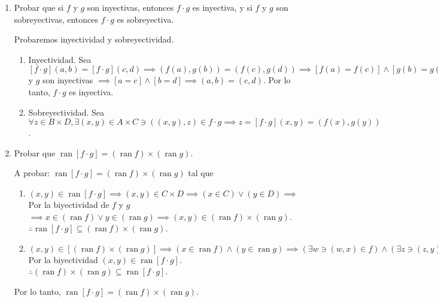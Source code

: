 \begin{problema}[Ejercicio 5]
\begin{enumerate}
\begin{dem}
		\end{dem}
		\item Probar que si $f$ y $g$ son inyectivas, entonces $f \cdot g$ es inyectiva, y si $f$ y $g$ son sobreyectivas, entonces $f \cdot g$ es sobreyectiva. 
		\begin{dem}
			Probaremos inyectividad y sobreyectividad. 
			\begin{enumerate}
				\item Inyectividad. Sea 
					$[f\cdot g](a,b) = [f\cdot g](c,d)\implies(f(a),g(b))=(f(c),g(d))\implies [f(a)=f(c)]\wedge [g(b)=g(d)]\implies f$ y $g$ son inyectivas $\implies[a=c]\wedge [b=d]\implies (a,b)=(c,d)$. Por lo tanto, $f\cdot g$ es inyectiva.   
				\item Sobreyectividad. Sea $\forall z\in B\times D, \exists(x,y)\in A\times C\ni ((x,y),z)\in f\cdot g\implies z = 	[f \cdot g](x, y)=(f(x), g(y)) $.  
			\end{enumerate}
		\end{dem}
		\item Probar que $\operatorname{ran}[f \cdot g]=(\operatorname{ran} f) \times(\operatorname{ran} g)$.
		\begin{dem}
			A probar: $\operatorname{ran}[f \cdot g]=(\operatorname{ran} f) \times(\operatorname{ran} g)$ tal que 
			\begin{enumerate} 
				\item[$(\subseteq)$] $(x,y) \in \operatorname{ran}[f \cdot g]\implies (x,y)\in C\times D\implies (x\in C)\vee (y\in D)\implies $ Por la biyectividad de $f$ y $g$ $\implies x\in (\operatorname{ran} f) \vee y \in (\operatorname{ran} g)\implies (x,y)\in (\operatorname{ran} f) \times(\operatorname{ran} g)$. $\therefore \operatorname{ran}[f \cdot g]\subseteq (\operatorname{ran} f) \times(\operatorname{ran} g)$. 
				\item[$(\supseteq)$] $(x,y)\in \left[(\operatorname{ran} f) \times(\operatorname{ran} g)\right]\implies  (x\in \operatorname{ran} f) \wedge (y\in \operatorname{ran} g)\implies (\exists w \ni (w, x)\in f)\wedge (\exists z \ni (z, y)\in g)\implies ((w,x)\in A\times C)\wedge ((z,y)\in B\times D)\implies (x\in C)\wedge (y\in D)\implies (x,y)\in C\times D\implies $ Por la biyectividad $(x,y)\in\operatorname{ran}[f \cdot g]$. $\therefore  (\operatorname{ran} f) \times(\operatorname{ran} g)\subseteq  \operatorname{ran}[f \cdot g]$.
			\end{enumerate}
			
			Por lo tanto, $\operatorname{ran}[f \cdot g]=(\operatorname{ran} f) \times(\operatorname{ran} g)$.
			
		\end{dem}
	\end{enumerate}
	
\end{problema}


